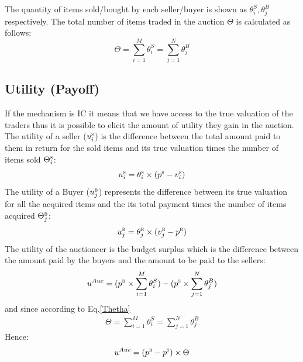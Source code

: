 The quantity of items sold/bought by each seller/buyer is shown as $\theta_i^S, \theta_j^B$ respectively. The total number of items traded in the auction $\Theta$ is calculated as follows:
\begin{equation}
\label{Thetha}
\Theta = \sum_{i=1}^{M} \theta_i^S = \sum_{j=1}^{N} \theta_j^B
\end{equation}

\subsection{Utility (Payoff)}
If the mechanism is IC it means that we have access to the true valuation of the traders thus it is possible to elicit the amount of utility they gain in the auction. The utility of a seller ($u_{i}^\textsc{s}$) is the difference between the total amount paid to them in return for the sold items and its true valuation times the number of items sold $\Theta_{i}^\textsc{s}$:
\begin{equation}
\label{seller_utility_formula}
u_{i}^\textsc{s} = {\theta_{i}^\textsc{s}}  \times (p^\textsc{s} - {v_{i}^\textsc{s}})
\end{equation}
The utility of a Buyer ($u_{j}^\textsc{b}$) represents the difference between its true valuation for all the acquired items and the its total payment times the number of items acquired $\Theta_{j}^\textsc{b}$:
\begin{equation}
\label{buyer-utility-formula}
u_{j}^\textsc{b} = {\theta_{j}^\textsc{b}}  \times ({v_{j}^\textsc{b}}-p^\textsc{b})
\end{equation}
The utility of the auctioneer is the budget surplus which is the difference between the amount paid by the buyers and the amount to be paid to the sellers:
\begin{equation}
\label{util-auc}
u^{Auc} = (p^\textsc{b} \times \sum_{i=1}^{M} \theta_i^S) - (p^\textsc{s} \times \sum_{j=1}^{N} \theta_j^B)
\end{equation}
and since according to Eq.\ref{Thetha}
\begin{eqnarray*}
\Theta = \sum_{i=1}^{M} \theta_i^S = \sum_{j=1}^{N} \theta_j^B
\end{eqnarray*}
Hence:
\begin{eqnarray}
u^{Auc} = (p^\textsc{b} - p^\textsc{s}) \times \Theta
\end{eqnarray}
